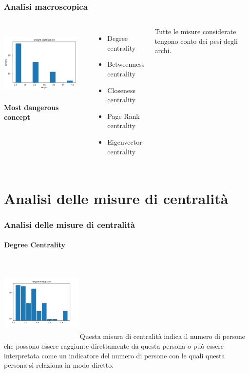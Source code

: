 \documentclass[hyperref={pdfpagelabels=false}]{beamer}
\begin{document}
\begin{frame}
\frametitle{Analisi macroscopica}
\begin{columns}
             \centering
             \includegraphics[height=4cm, width=4cm]{images/weight_d.png}
              \textbf{Most dangerous concept}\\ \begin{itemize}
                  \item Degree centrality
                  \item Betweenness centrality
                  \item Closeness centrality
                  \item Page Rank centrality
                  \item Eigenvector centrality
              \end{itemize}
              
             Tutte le misure considerate tengono conto dei pesi degli archi.
         \end{columns} 

\end{frame}


\section{Analisi delle misure di centralità}

\begin{frame}
\frametitle{Analisi delle misure di centralità}
\framesubtitle{Degree Centrality}
\begin{columns}
             \centering
             \includegraphics[height=4cm, 
             width=4cm]{images/centrality_measures/degree.pdf}
              Questa misura di centralità indica il numero di persone che possono essere raggiunte direttamente da questa persona o può essere interpretata come un indicatore del numero di persone con le quali questa persona si relaziona in modo diretto. 
         \end{columns} 

\end{frame}
\end{document}
